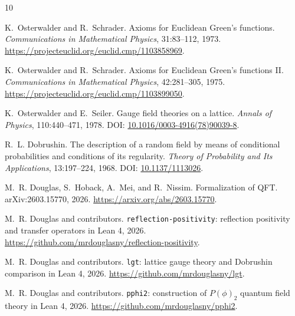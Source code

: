 \documentclass[11pt]{article}
\begin{document}
\begin{thebibliography}{10}

K.~Osterwalder and R.~Schrader.
\newblock Axioms for Euclidean Green's functions.
\newblock \emph{Communications in Mathematical Physics}, 31:83--112, 1973.
\newblock \url{https://projecteuclid.org/euclid.cmp/1103858969}.

K.~Osterwalder and R.~Schrader.
\newblock Axioms for Euclidean Green's functions II.
\newblock \emph{Communications in Mathematical Physics}, 42:281--305, 1975.
\newblock \url{https://projecteuclid.org/euclid.cmp/1103899050}.

K.~Osterwalder and E.~Seiler.
\newblock Gauge field theories on a lattice.
\newblock \emph{Annals of Physics}, 110:440--471, 1978.
\newblock DOI: \href{https://doi.org/10.1016/0003-4916(78)90039-8}
{10.1016/0003-4916(78)90039-8}.

R.~L. Dobrushin.
\newblock The description of a random field by means of conditional
probabilities and conditions of its regularity.
\newblock \emph{Theory of Probability and Its Applications}, 13:197--224,
1968.
\newblock DOI: \href{https://doi.org/10.1137/1113026}{10.1137/1113026}.

M.~R. Douglas, S.~Hoback, A.~Mei, and R.~Nissim.
\newblock Formalization of QFT.
\newblock arXiv:2603.15770, 2026.
\newblock \url{https://arxiv.org/abs/2603.15770}.

M.~R. Douglas and contributors.
\newblock \texttt{reflection-positivity}: reflection positivity and transfer
operators in Lean 4, 2026.
\newblock \url{https://github.com/mrdouglasny/reflection-positivity}.

M.~R. Douglas and contributors.
\newblock \texttt{lgt}: lattice gauge theory and Dobrushin comparison in
Lean 4, 2026.
\newblock \url{https://github.com/mrdouglasny/lgt}.

M.~R. Douglas and contributors.
\newblock \texttt{pphi2}: construction of $P(\phi)_2$ quantum field theory
in Lean 4, 2026.
\newblock \url{https://github.com/mrdouglasny/pphi2}.

\end{thebibliography}
\end{document}
